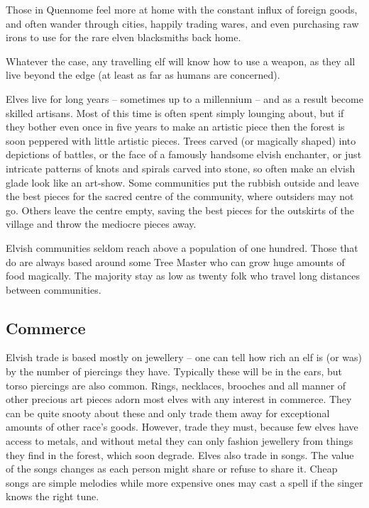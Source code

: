 \begin{multicols}{2}
Those in Quennome feel more at home with the constant influx of foreign goods, and often wander through cities, happily trading wares, and even purchasing raw irons to use for the rare elven blacksmiths back home.

Whatever the case, any travelling elf will know how to use a weapon, as they all live beyond the \gls{edge} (at least as far as humans are concerned).

Elves live for long years -- sometimes up to a millennium -- and as a result become skilled artisans.
Most of this time is often spent simply lounging about, but if they bother even once in five years to make an artistic piece then the forest is soon peppered with little artistic pieces.
Trees carved (or magically shaped) into depictions of battles, or the face of a famously handsome elvish enchanter, or just intricate patterns of knots and spirals carved into stone, so often make an elvish glade look like an art-show.
Some communities put the rubbish outside and leave the best pieces for the sacred centre of the community, where outsiders may not go.
Others leave the centre empty, saving the best pieces for the outskirts of the village and throw the mediocre pieces away.

Elvish communities seldom reach above a population of one hundred.
Those that do are always based around some Tree Master who can grow huge amounts of food magically.
The majority stay as low as twenty folk who travel long distances between communities.

\subsection{Commerce}

Elvish trade is based mostly on jewellery -- one can tell how rich an elf is (or was) by the number of piercings they have.
Typically these will be in the ears, but torso piercings are also common.
Rings, necklaces, brooches and all manner of other precious art pieces adorn most elves with any interest in commerce.
They can be quite snooty about these and only trade them away for exceptional amounts of other race's goods.
However, trade they must, because few elves have access to metals, and without metal they can only fashion jewellery from things they find in the forest, which soon degrade.
Elves also trade in songs.
The value of the songs changes as each person might share or refuse to share it.
Cheap songs are simple melodies while more expensive ones may cast a spell if the singer knows the right tune.


\end{multicols}
